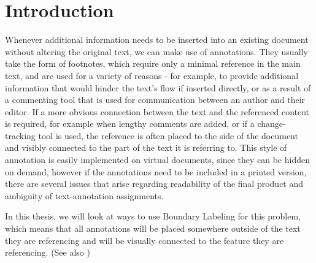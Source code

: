 \documentclass[11pt,a4paper]{vutinfth}
\begin{document}
\frontmatter
\addstatementpage






\tableofcontents

\mainmatter



\chapter{Introduction}
Whenever additional information needs to be inserted into an existing document without altering the original text, we can make use of annotations. They usually take the form of footnotes, which require only a minimal reference in the main text, and are used for a variety of reasons - for example, to provide additional information that would hinder the text's flow if inserted directly, or as a result of a commenting tool that is used for communication between an author and their editor.
If a more obvious connection between the text and the referenced content is required, for example when lengthy comments are added, or if a change-tracking tool is used, the reference is often placed to the side of the document and visibly connected to the part of the text it is referring to. This style of annotation is easily implemented on virtual documents, since they can be hidden on demand, however if the annotations need to be included in a printed version, there are several issues that arise regarding readability of the final product and ambiguity of text-annotation assignments.

In this thesis, we will look at ways to use Boundary Labeling for this problem, which means that all annotations will be placed somewhere outside of the text they are referencing and will be visually connected to the feature they are referencing. (See also \cite{Bekos2005}) 
\end{document}
